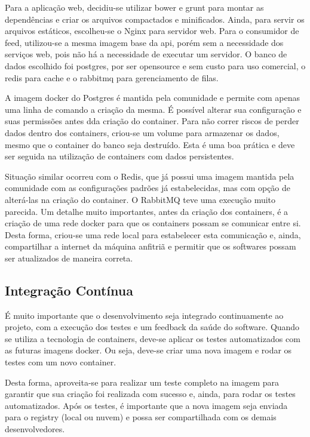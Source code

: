 \documentclass[
	12pt,				%
	openright,			%
	oneside,			%
	a4paper,			%
	chapter=TITLE,		%
	section=TITLE,		%
	english,			%
	french,				%
	spanish,			%
	brazil				%
	]{abntex2}
\begin{document}
Para a aplicação web, decidiu-se utilizar bower e grunt para montar as dependências e criar os arquivos compactados e minificados. Ainda, para servir os arquivos estáticos, escolheu-se o Nginx para servidor web. Para o consumidor de feed, utilizou-se a mesma imagem base da api, porém sem a necessidade dos serviços web, pois não há a necessidade de executar um servidor. O banco de dados escolhido foi postgres, por ser opensource e sem custo para uso comercial, o redis para cache e o rabbitmq para gerenciamento de filas.

A imagem docker do Postgres é mantida pela comunidade e permite com apenas uma linha de comando a criação da mesma. É possível alterar sua configuração e suas permissões antes dda criação do container. Para não correr riscos de perder dados dentro dos containers, criou-se um volume para armazenar os dados, mesmo que o container do banco seja destruído. Esta é uma boa prática e deve ser seguida na utilização de containers com dados persistentes.

Situação similar ocorreu com o Redis, que já possui uma imagem mantida pela comunidade com as configurações padrões já estabelecidas, mas com opção de alterá-las na criação do container. O RabbitMQ teve uma execução muito parecida. Um detalhe muito importantes, antes da criação dos containers, é a criação de uma rede docker para que os containers possam se comunicar entre si. Desta forma, criou-se uma rede local para estabelecer esta comunicação e, ainda, compartilhar a internet da máquina anfitriã e permitir que os softwares possam ser atualizados de maneira correta.

\subsection{Integração Contínua}

É muito importante que o desenvolvimento seja integrado continuamente ao projeto, com a execução dos testes e um feedback da saúde do software. Quando se utiliza a tecnologia de containers, deve-se aplicar os testes automatizados com as futuras imagens docker. Ou seja, deve-se criar uma nova imagem e rodar os testes com um novo container.

Desta forma, aproveita-se para realizar um teste completo na imagem para garantir que sua criação foi realizada com sucesso e, ainda, para rodar os testes automatizados. Após os testes, é importante que a nova imagem seja enviada para o registry (local ou nuvem) e possa ser compartilhada com os demais desenvolvedores.
\end{document}
